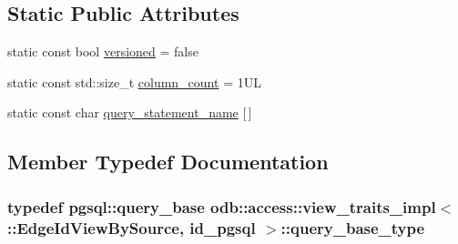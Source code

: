 \subsection*{Static Public Attributes}
\begin{DoxyCompactItemize}
\item 
static const bool \hyperlink{classodb_1_1access_1_1view__traits__impl_3_01_1_1_edge_id_view_by_source_00_01id__pgsql_01_4_a88910a1a680e2166fc4a4fb6efa3bf79}{versioned} = false
\item 
static const std\+::size\+\_\+t \hyperlink{classodb_1_1access_1_1view__traits__impl_3_01_1_1_edge_id_view_by_source_00_01id__pgsql_01_4_a501b59bdb7cfed399be724d26a32ad9e}{column\+\_\+count} = 1\+U\+L
\item 
static const char \hyperlink{classodb_1_1access_1_1view__traits__impl_3_01_1_1_edge_id_view_by_source_00_01id__pgsql_01_4_a680a9c0bd3a396769122cdaa8425f03e}{query\+\_\+statement\+\_\+name} \mbox{[}$\,$\mbox{]}
\end{DoxyCompactItemize}


\subsection{Member Typedef Documentation}
\hypertarget{classodb_1_1access_1_1view__traits__impl_3_01_1_1_edge_id_view_by_source_00_01id__pgsql_01_4_a1268e0d4560bb9ddbc67863974201f52}{}
\subsubsection[{query\+\_\+base\+\_\+type}]{\setlength{\rightskip}{0pt plus 5cm}typedef pgsql\+::query\+\_\+base odb\+::access\+::view\+\_\+traits\+\_\+impl$<$ \+::{\bf Edge\+Id\+View\+By\+Source}, id\+\_\+pgsql $>$\+::{\bf query\+\_\+base\+\_\+type}}\label{classodb_1_1access_1_1view__traits__impl_3_01_1_1_edge_id_view_by_source_00_01id__pgsql_01_4_a1268e0d4560bb9ddbc67863974201f52}
\hypertarget{classodb_1_1access_1_1view__traits__impl_3_01_1_1_edge_id_view_by_source_00_01id__pgsql_01_4_a40f7425535527f4913ad949024d370fc}{}
